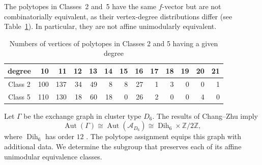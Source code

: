 \documentclass[10pt]{amsart}
\numberwithin{equation}{section}
\theoremstyle{plain}
\theoremstyle{definition}
\theoremstyle{remark}
\begin{document}
The polytopes in Classes~2 and~5 have the same $f$-vector but
are not combinatorially equivalent, as their vertex-degree
distributions differ (see Table~\ref{table_degrees_Case25}).
In particular, they are not affine unimodularly equivalent.
\begin{table}
	\begin{tabular}{c|rrrrrrrrrrrr}
		\toprule 
		degree & 10 & 11 & 12 & 13 & 14 & 15 & 16 & 17 & 18 & 19 & 20 & 21 \\
		\midrule 
		Class 2 & 100 & 137 & 34 & 49 & 8 & 8 & 27 & 1 & 3 & 0 & 0 & 1 
		\\
		Class 5  &  110 & 130 & 18 & 60 & 18 & 0 & 26 & 2 & 0 & 0 & 4 & 0\\
		\bottomrule 
	\end{tabular}
	\caption{Numbers of vertices of polytopes in Classes 2 and 5  having a given degree}
	\label{table_degrees_Case25}
\end{table}

Let $\Gamma$ be the exchange graph in cluster type $D_6$. 
The results of Chang--Zhu imply
\[
\operatorname{Aut}(\Gamma)
\cong \operatorname{Aut}(\mathcal A_{D_6})
\cong \operatorname{Dih}_6\times\mathbb Z/2\mathbb Z,
\]
where $\operatorname{Dih}_6$ has order $12$
\cite{CZ16finite,CZ20exchange}.
The polytope assignment equips this graph with additional
data. We determine the subgroup that preserves each of its
affine unimodular equivalence classes.
\end{document}
